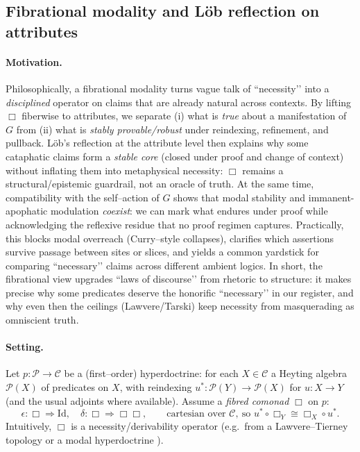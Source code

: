 \documentclass[11pt]{article}
\theoremstyle{upright}
\begin{document}
\subsection{Fibrational modality and Löb reflection on attributes}\label{subsec:fibrational-gl}
 
\paragraph{Motivation.}
Philosophically, a fibrational modality turns vague talk of “necessity’’ into a \emph{disciplined} operator on claims that are already natural across contexts. By lifting $\Box$ fiberwise to attributes, we separate (i) what is \emph{true} about a manifestation of $G$ from (ii) what is \emph{stably provable/robust} under reindexing, refinement, and pullback. Löb’s reflection at the attribute level then explains why some cataphatic claims form a \emph{stable core} (closed under proof and change of context) without inflating them into metaphysical necessity: $\Box$ remains a structural/epistemic guardrail, not an oracle of truth. At the same time, compatibility with the self–action of $G$ shows that modal stability and immanent-apophatic modulation \emph{coexist}: we can mark what endures under proof while acknowledging the reflexive residue that no proof regimen captures. Practically, this blocks modal overreach (Curry–style collapses), clarifies which assertions survive passage between sites or slices, and yields a common yardstick for comparing “necessary’’ claims across different ambient logics. In short, the fibrational view upgrades “laws of discourse’’ from rhetoric to structure: it makes precise why some predicates deserve the honorific “necessary’’ in our register, and why even then the ceilings (Lawvere/Tarski) keep necessity from masquerading as omniscient truth.

\paragraph{Setting.}
Let $p:\mathcal P\!\to\!\mathcal C$ be a (first–order) hyperdoctrine: for each $X\in\mathcal C$ a Heyting algebra $\mathcal P(X)$ of predicates on $X$, with reindexing $u^\ast:\mathcal P(Y)\!\to\!\mathcal P(X)$ for $u:X\!\to\!Y$ (and the usual adjoints where available). Assume a \emph{fibred comonad} $\Box$ on $p$:
\[
\epsilon:\Box\Rightarrow \mathrm{Id},\quad \delta:\Box\Rightarrow \Box\Box,\qquad
\text{cartesian over }\mathcal C,\ \text{so }u^\ast\circ \Box_Y\cong \Box_X\circ u^\ast.
\]
Intuitively, $\Box$ is a necessity/derivability operator (e.g.\ from a Lawvere–Tierney topology \citep{Lawvere1971Quantifiers} or a modal hyperdoctrine \citep{Jacobs1999, Johnstone2002Elephant}).
\end{document}
